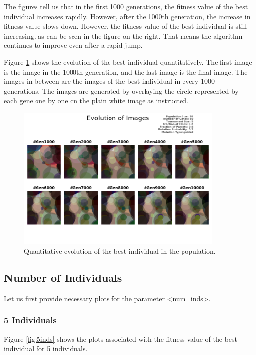 \documentclass{assignment}
\begin{document}
The figures tell us that in the first 1000 generations, the fitness value of the best individual increases rapidly. However, after the 1000th generation, the increase in fitness value slows down. However, the fitness value of the best individual is still increasing, as can be seen in the figure on the right. That means the algorithm continues to improve even after a rapid jump.

Figure \ref{fig:default_image} shows the evolution of the best individual quantitatively. The first image is the image in the 1000th generation, and the last image is the final image. The images in between are the images of the best individual in every 1000 generations. The images are generated by overlaying the circle represented by each gene one by one on the plain white image as instructed.


\begin{figure}[!htb]
    \centering
    \includegraphics[width=0.9\textwidth]{figures/images_output_20_50_5_0.2_0.6_0.2_guided.png}
    \caption{Quantitative evolution of the best individual in the population.}
    \label{fig:default_image}
\end{figure}

\subsection{Number of Individuals}
Let us first provide necessary plots for the parameter \textless{}num\_inds\textgreater{}. 
\subsubsection{5 Individuals}
Figure \ref{fig:5inds} shows the plots associated with the fitness value of the best individual for 5 individuals.
\end{document}
